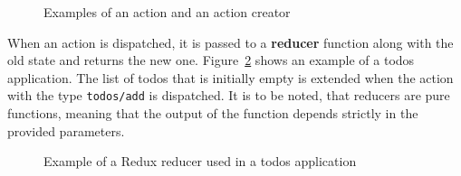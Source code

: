 \begin{figure}[h!]
\begin{Shaded}
\begin{Highlighting}[]
\OperatorTok{=}\NormalTok{ \{}
  \OperatorTok{:} \OperatorTok{,}
  \OperatorTok{:} 
\NormalTok{\}}

\OperatorTok{=}\KeywordTok{=\textgreater{}}\NormalTok{ (\{}
  \OperatorTok{:} \OperatorTok{,}
\NormalTok{\})}
\end{Highlighting}
\end{Shaded}
\caption{Examples of an action and an action creator}
\label{code_action_and_action_creator}
\end{figure}

When an action is dispatched, it is passed to a \textbf{reducer}
function along with the old state and returns the new one. Figure~\ref{code_todo_redux}
shows an example of a todos application. The list of todos that is
initially empty is extended when the action with the type
\texttt{todos/add} is dispatched. It is to be noted, that reducers are
pure functions, meaning that the output of the function depends strictly
in the provided parameters.

\begin{figure}
\begin{Shaded}
\begin{Highlighting}[]
 \OperatorTok{=}\NormalTok{ \{ }\OperatorTok{:}\NormalTok{ [] \}}\OperatorTok{,}
   \OperatorTok{===} \NormalTok{) \{}
    \NormalTok{ \{}
      \OperatorTok{:}\NormalTok{ [}
                \OperatorTok{,}
\NormalTok{              \{ }
                    \OperatorTok{:}\OperatorTok{,}
                    \OperatorTok{:} \OperatorTok{,}
                    \OperatorTok{:} \NormalTok{()}
\NormalTok{                \}}
\NormalTok{    \}}
\NormalTok{  \}}
\NormalTok{\}}
\end{Highlighting}
\end{Shaded}
\caption{Example of a Redux reducer used in a todos application}
\label{code_todo_redux}
\end{figure}


